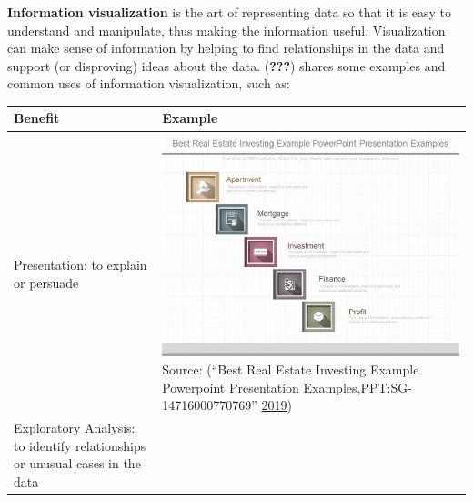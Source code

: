 \documentclass[]{book}
\begin{document}
\textbf{Information visualization} is the art of representing data so that it is easy to understand and manipulate, thus making the information useful. Visualization can make sense of information by helping to find relationships in the data and support (or disproving) ideas about the data. ({\textbf{???}}) shares some examples and common uses of information visualization, such as:

\begin{longtable}[]{@{}ll@{}}
\toprule
\begin{minipage}[b]{0.47\columnwidth}\raggedright
Benefit\strut
\end{minipage} & \begin{minipage}[b]{0.47\columnwidth}\raggedright
Example\strut
\end{minipage}\tabularnewline
\midrule
\endhead
\begin{minipage}[t]{0.47\columnwidth}\raggedright
Presentation: to explain or persuade\strut
\end{minipage} & \begin{minipage}[t]{0.47\columnwidth}\raggedright
\includegraphics{images/Presentation.jpg} Source: (``Best Real Estate Investing Example Powerpoint Presentation Examples,PPT:SG-14716000770769'' \protect\hyperlink{ref-slide_geeks}{2019})\strut
\end{minipage}\tabularnewline
\begin{minipage}[t]{0.47\columnwidth}\raggedright
Exploratory Analysis: to identify relationships or unusual cases in the data\strut
\end{minipage} & \begin{minipage}[t]{0.47\columnwidth}\raggedright

\end{minipage}
\end{longtable}
\end{document}
